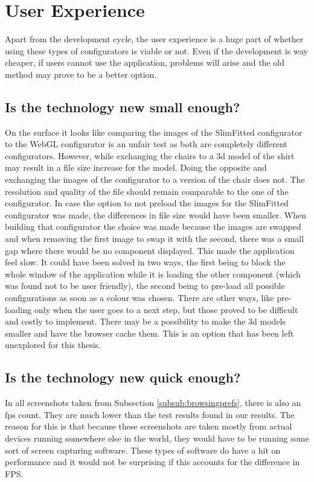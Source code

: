 \section{User Experience}
Apart from the development cycle, the user experience is a huge part of whether using these types of configurators is viable or not. Even if the development is way cheaper, if users cannot use the application, problems will arise and the old method may prove to be a better option.

\subsection {Is the technology new small enough?}
On the surface it looks like comparing the images of the SlimFitted configurator to the WebGL configurator is an unfair test as both are completely different configurators. However, while exchanging the chairs to a 3d model of the shirt may result in a file size increase for the model. Doing the opposite and exchanging the images of the configurator to a version of the chair does not. The resolution and quality of the file should remain comparable to the one of the configurator.\newline
In case the option to not preload the images for the SlimFitted configurator was made, the differences in file size would have been smaller. When building that configurator the choice was made because the images are swapped and when removing the first image to swap it with the second, there was a small gap where there would be no component displayed. This made the application feel slow. It could have been solved in two ways, the first being to block the whole window of the application while it is loading the other component (which was found not to be user friendly), the second being to pre-load all possible configurations as soon as a colour was chosen. There are other ways, like pre-loading only when the user goes to a next step, but those proved to be difficult and costly to implement. \newline
There may be a possibility to make the 3d models smaller and have the browser cache them. This is an option that has been left unexplored for this thesis.

\subsection {Is the technology new quick enough?}
In all screenshots taken from Subsection \ref{subsub:browsingprefs}, there is also an fps count. They are much lower than the test results found in our results. The reason for this is that because these screenshots are taken mostly from actual devices running somewhere else in the world, they would have to be running some sort of screen capturing software. These types of software do have a hit on performance and it would not be surprising if this accounts for the difference in FPS.

